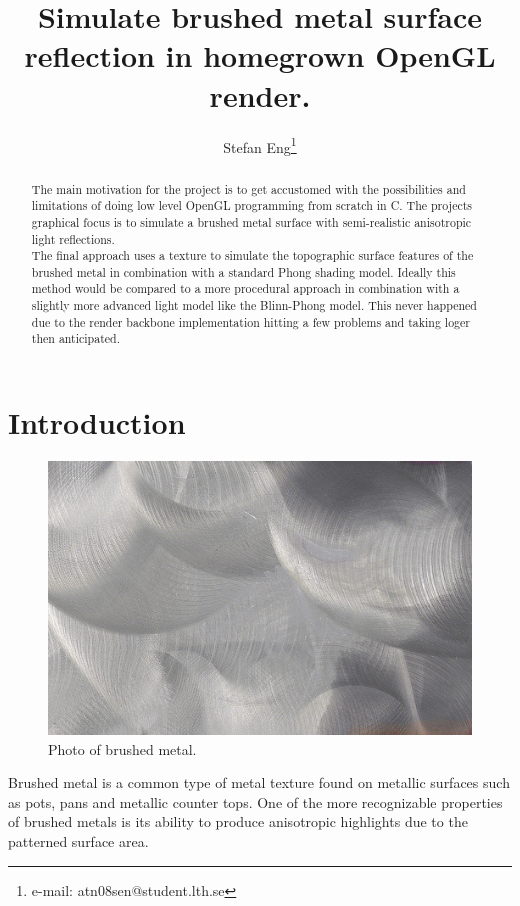 \documentclass{acmsiggraph}               %
\title{Simulate brushed metal surface reflection in homegrown OpenGL render.}
\author{Stefan Eng\thanks{e-mail: atn08sen@student.lth.se}
}
\affiliation{Lund University\\ Sweden}
\begin{document}
\ifpdf
\else
\fi


\maketitle

\begin{abstract}
The main motivation for the project is to get accustomed with the possibilities
and limitations of doing low level OpenGL programming from scratch in C. The projects
graphical focus is to simulate a brushed metal surface with semi-realistic
anisotropic light reflections. \\

The final approach uses a texture to simulate the
topographic surface features of the brushed metal in combination with a
standard Phong shading model\cite{wiki_phong}.
Ideally this method would be compared to a more procedural approach in
combination with a slightly more advanced light model like the Blinn-Phong
model\cite{wiki_blinn}. This never happened due to the render backbone
implementation hitting a few problems and taking loger then anticipated.

\end{abstract}


\section{Introduction}

\begin{figure}[!ht]
    \centering
    \includegraphics[width=0.7\columnwidth]{brushed.jpg}
    \caption{Photo of brushed metal.}
    \label{brushed_real}
\end{figure}

Brushed metal is a common type of metal texture found on metallic surfaces such
as pots, pans and metallic counter tops. One of the more
recognizable properties of brushed metals is its ability to produce anisotropic
highlights due to the patterned surface area. \\
\end{document}
